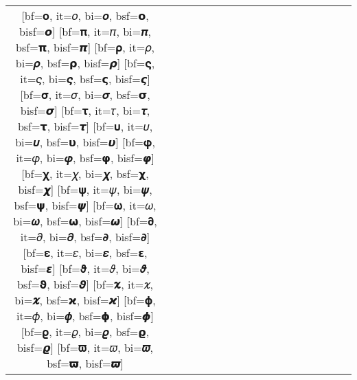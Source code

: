 \documentclass{unittest}
\begin{document}
\begin{tabular}{cc|cc:cc:cc:cc|cc:cc:cc:cc}
[bf=𝛐, it=𝜊, bi=𝝄, bsf=𝝾, bisf=𝞸]
[bf=𝛑, it=𝜋, bi=𝝅, bsf=𝝿, bisf=𝞹]
[bf=𝛒, it=𝜌, bi=𝝆, bsf=𝞀, bisf=𝞺]
[bf=𝛓, it=𝜍, bi=𝝇, bsf=𝞁, bisf=𝞻]
[bf=𝛔, it=𝜎, bi=𝝈, bsf=𝞂, bisf=𝞼]
[bf=𝛕, it=𝜏, bi=𝝉, bsf=𝞃, bisf=𝞽]
[bf=𝛖, it=𝜐, bi=𝝊, bsf=𝞄, bisf=𝞾]
[bf=𝛗, it=𝜑, bi=𝝋, bsf=𝞅, bisf=𝞿]
[bf=𝛘, it=𝜒, bi=𝝌, bsf=𝞆, bisf=𝟀]
[bf=𝛙, it=𝜓, bi=𝝍, bsf=𝞇, bisf=𝟁]
[bf=𝛚, it=𝜔, bi=𝝎, bsf=𝞈, bisf=𝟂]
[bf=𝛛, it=𝜕, bi=𝝏, bsf=𝞉, bisf=𝟃]
\midrule%
[bf=𝛆, it=𝜀, bi=𝜺, bsf=𝝴, bisf=𝞮]
[bf=𝛝, it=𝜗, bi=𝝑, bsf=𝞋, bisf=𝟅]
[bf=𝛞, it=𝜘, bi=𝝒, bsf=𝞌, bisf=𝟆]
[bf=𝛟, it=𝜙, bi=𝝓, bsf=𝞍, bisf=𝟇]
[bf=𝛠, it=𝜚, bi=𝝔, bsf=𝞎, bisf=𝟈]
[bf=𝛡, it=𝜛, bi=𝝕, bsf=𝞏, bisf=𝟉]
\bottomrule
\end{tabular}
\end{document}
